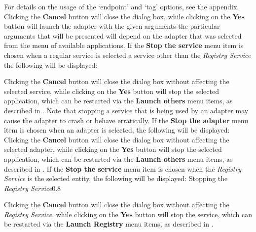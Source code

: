 For details on the usage of the `endpoint' and `tag' options, see the 
 appendix.
Clicking the \textbf{Cancel} button will close the dialog box, while clicking on the
\textbf{Yes} button will launch the adapter with the given arguments \longDash{} the
particular arguments that will be presented will depend on the adapter that was selected
from the menu of available applications.
\secondaryEnd
\condPage
{}
If the \textbf{Stop the service} menu item is chosen when a regular service is selected
\longDash{} a service other than the \emph{Registry Service} \longDash{} the following
will be displayed:

Clicking the \textbf{Cancel} button will close the dialog box without affecting the
selected service, while clicking on the \textbf{Yes} button will stop the selected
application, which can be restarted via the \textbf{Launch others \textellipsis} menu
items, as described in .
Note that stopping a service that is being used by an adapter may cause the adapter to
crash or behave erratically.
\secondaryEnd
{}
If the \textbf{Stop the adapter} menu item is chosen when an adapter is selected, the
following will be displayed:
\\

Clicking the \textbf{Cancel} button will close the dialog box without affecting the
selected adapter, while clicking on the \textbf{Yes} button will stop the selected
application, which can be restarted via the \textbf{Launch others \textellipsis} menu
items, as described in .
\secondaryEnd
{}
If the \textbf{Stop the service} menu item is chosen when the \emph{Registry Service} is
the selected entity, the following will be displayed:
%
{Stopping the \emph{Registry Service}}{0.8}

Clicking the \textbf{Cancel} button will close the dialog box without affecting the
\emph{Registry Service}, while clicking on the \textbf{Yes} button will stop the service,
which can be restarted via the \textbf{Launch Registry} menu items, as described in
.
\secondaryEnd
\primaryEnd{}